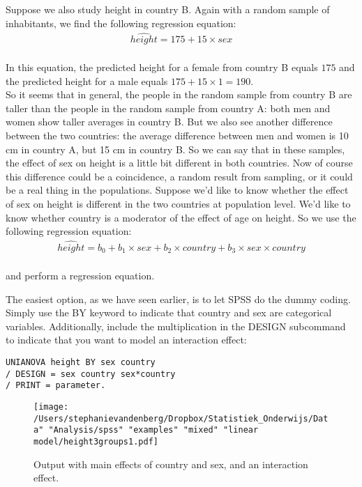 Suppose we also study height in country B. Again with a random sample of inhabitants, we find the following regression equation:
\\
\begin{eqnarray} 
\widehat{height} = 175 + 15  \times sex  \nonumber
\end{eqnarray}
\\
In this equation, the predicted height for a female from country B equals $175$ and the predicted height for a male equals $175 + 15 \times 1 = 190$.\\

So it seems that in general, the people in the random sample from country B are taller than the people in the random sample from country A: both men and women show taller averages in country B. But we also see another difference between the two countries: the average difference between men and women is 10 cm in country A, but 15 cm in country B. So we can say that in these samples, the effect of sex on height is a little bit different in both countries. Now of course this difference could be a coincidence, a random result from sampling, or it could be a real thing in the populations. Suppose we'd like to know whether the effect of sex on height is different in the two countries at population level. We'd like to know whether country is a moderator of the effect of age on height. So we use the following regression equation:
\\
\begin{eqnarray} 
\widehat{height} = b_0 + b_1  \times sex + b_2 \times country +  b_3 \times sex \times country  \nonumber
\end{eqnarray}
\\
and perform a regression equation. 

The easiest option, as we have seen earlier, is to let SPSS do the dummy coding. Simply use the BY keyword to indicate that country and sex are categorical variables. Additionally, include the multiplication in the DESIGN subcommand to indicate that you want to model an interaction effect:

\begin{verbatim}
UNIANOVA height BY sex country 
/ DESIGN = sex country sex*country
/ PRINT = parameter.
\end{verbatim}


\begin{figure}[h]
    \begin{center}
       \texttt{[image: /Users/stephanievandenberg/Dropbox/Statistiek\_Onderwijs/Data" "Analysis/spss" "examples" "mixed" "linear model/height3groups1.pdf]}
    \end{center}
    \label{fig:interactionheightcountrysex}
    \caption{Output with main effects of country and sex, and an interaction effect.}
\end{figure}

